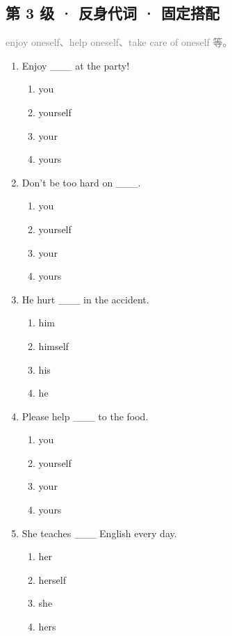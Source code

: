\documentclass[11pt,a4paper]{ctexart}
\begin{document}
\subsection*{第 3 级 · 反身代词 · 固定搭配}
\noindent\textcolor{gray}{enjoy oneself、help oneself、take care of oneself 等。}\par\smallskip
\begin{enumerate}[leftmargin=*,itemsep=4pt]
\item Enjoy \_\_\_ at the party!
\begin{enumerate}[label=\Alph*.,leftmargin=2em,itemsep=1pt,topsep=2pt]
\item you
\item yourself
\item your
\item yours
\end{enumerate}
\item Don’t be too hard on \_\_\_.
\begin{enumerate}[label=\Alph*.,leftmargin=2em,itemsep=1pt,topsep=2pt]
\item you
\item yourself
\item your
\item yours
\end{enumerate}
\item He hurt \_\_\_ in the accident.
\begin{enumerate}[label=\Alph*.,leftmargin=2em,itemsep=1pt,topsep=2pt]
\item him
\item himself
\item his
\item he
\end{enumerate}
\item Please help \_\_\_ to the food.
\begin{enumerate}[label=\Alph*.,leftmargin=2em,itemsep=1pt,topsep=2pt]
\item you
\item yourself
\item your
\item yours
\end{enumerate}
\item She teaches \_\_\_ English every day.
\begin{enumerate}[label=\Alph*.,leftmargin=2em,itemsep=1pt,topsep=2pt]
\item her
\item herself
\item she
\item hers

\end{enumerate}
\end{enumerate}
\end{document}
